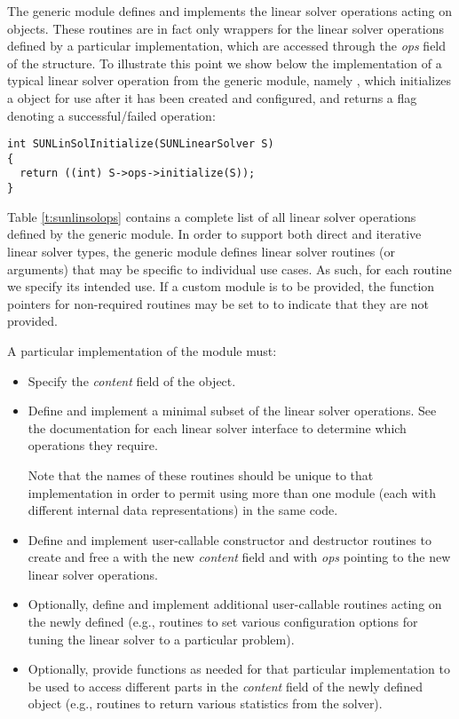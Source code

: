 The generic {\sunlinsol} module defines and implements the linear
solver operations acting on  objects.  These
routines are in fact only wrappers for the linear solver operations
defined by a particular {\sunlinsol} implementation, which are
accessed through the {\em ops} field of the 
structure. To illustrate this point we show below the implementation
of a typical linear solver operation from the generic {\sunlinsol}
module, namely , which initializes a
{\sunlinsol} object for use after it has been created and configured,
and returns a flag denoting a successful/failed operation:
\begin{verbatim}
int SUNLinSolInitialize(SUNLinearSolver S)
{
  return ((int) S->ops->initialize(S));
}
\end{verbatim}
Table \ref{t:sunlinsolops} contains a complete list of all linear
solver operations defined by the generic {\sunlinsol} module.  In
order to support both direct and iterative linear solver types, the
generic {\sunlinsol} module defines linear solver routines (or 
arguments) that may be specific to individual use cases.  As such,
for each routine we specify its intended use.  If a custom
{\sunlinsol} module is to be provided, the function pointers for
non-required routines may be set to  to indicate that they
are not provided.

A particular implementation of the {\sunlinsol} module must:
\begin{itemize}
\item Specify the {\em content} field of the  object.
\item Define and implement a minimal subset of the linear solver
  operations. See the documentation for each {\sundials} linear solver
  interface to determine which {\sunlinsol} operations they require.

  Note that the names of these routines should be unique to that
  implementation in order to permit using more than one {\sunlinsol}
  module (each with different  internal data
  representations) in the same code. 
\item Define and implement user-callable constructor and destructor
  routines to create and free a  with
  the new {\em content} field and with {\em ops} pointing to the
  new linear solver operations.
\item Optionally, define and implement additional user-callable routines
  acting on the newly defined  (e.g., routines to
  set various configuration options for tuning the linear solver to a
  particular problem).
\item Optionally, provide functions as needed for that particular
  implementation to be used to access different parts in the {\em
  content} field of the newly defined  object
  (e.g., routines to return various statistics from the solver).
\end{itemize}

